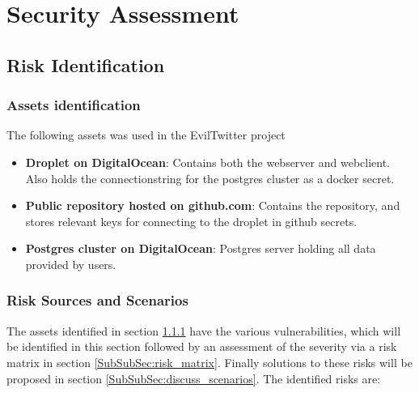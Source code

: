 \documentclass[report/main.tex]{subfiles}
\begin{document}
    \section{Security Assessment}
    \label{Sec:security}
        \subsection{Risk Identification}
            \subsubsection{Assets identification}
            \label{SubSubSec:assets_identification}
                The following assets was used in the EvilTwitter project
            
                \begin{itemize}
                    \item \textbf{Droplet on DigitalOcean}: Contains both the webserver and webclient. Also holds the connectionstring for the postgres cluster as a docker secret.
                    \item \textbf{Public repository hosted on github.com}: Contains the repository, and stores relevant keys for connecting to the droplet in github secrets. 
                    \item \textbf{Postgres cluster on DigitalOcean}: Postgres server holding all data provided by users. 
                \end{itemize}
        
            \subsubsection{Risk Sources and Scenarios}
            \label{SubSubSec:risk_sources_and_scenarios}
                The assets identified in section \ref{SubSubSec:assets_identification} have the various vulnerabilities, which will be identified in this section followed by an assessment of the severity via a risk matrix in section \ref{SubSubSec:risk_matrix}. Finally solutions to these risks will be proposed in section \ref{SubSubSec:discuss_scenarios}. The identified risks are:
            
\end{document}
